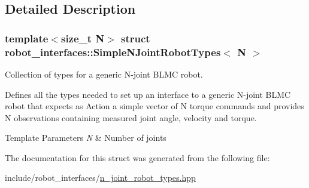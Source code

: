 \subsection{Detailed Description}
\subsubsection*{template$<$size\+\_\+t N$>$\newline
struct robot\+\_\+interfaces\+::\+Simple\+N\+Joint\+Robot\+Types$<$ N $>$}

Collection of types for a generic N-\/joint B\+L\+MC robot. 

Defines all the types needed to set up an interface to a generic N-\/joint B\+L\+MC robot that expects as Action a simple vector of N torque commands and provides N observations containing measured joint angle, velocity and torque.


\begin{DoxyTemplParams}{Template Parameters}
{\em N} & Number of joints \\
\hline
\end{DoxyTemplParams}


The documentation for this struct was generated from the following file\+:\begin{DoxyCompactItemize}
\item 
include/robot\+\_\+interfaces/\hyperlink{n__joint__robot__types_8hpp}{n\+\_\+joint\+\_\+robot\+\_\+types.\+hpp}\end{DoxyCompactItemize}
